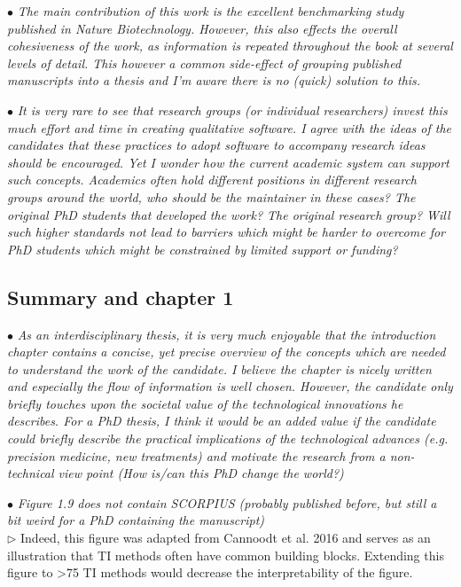 \documentclass[10pt]{article}
\newcommand{\exam}[2][\  ]{\hspace{0pt}\marginpar{\color{red}#1}$\bullet$ \textit{#2}}
\newcommand{\imp}[1]{{\color{red} #1}}
\newcommand{\nimp}[1]{{\color{gray} #1}}
\newcommand{\answ}[1]{{\color{blue} $\triangleright$ #1}}
\newcommand{\bigexclaim}{\raisebox{-0.1em}{\BigTriangleUp}\hspace{-0.32em}\llap{\small\textbf{!}}\hspace{0.32em}}
\newcommand{\tagimp}{\bigexclaim}
\newcommand{\tagtime}{{\Large $\hourglass$}}
\begin{document}
{\exam{\nimp{The main contribution of this work is the excellent benchmarking study
	published in Nature Biotechnology.} However, this also effects the overall
	cohesiveness of the work, as information is repeated throughout the book at
	several levels of detail. \nimp{This however a common side-effect of grouping
	published manuscripts into a thesis and I’m aware there is no (quick) solution
	to this.}}

\exam[\tagimp]{\nimp{It is very rare to see that research groups (or individual researchers) invest this
	much effort and time in creating qualitative software. I agree with the ideas of
	the candidates that these practices to adopt software to accompany research
	ideas should be encouraged.} Yet I wonder how the current academic system
	can support such concepts. Academics often hold different positions in
	different research groups around the world, who should be the maintainer in
	these cases? The original PhD students that developed the work? The original
	research group? Will such higher standards not lead to barriers which might
	be harder to overcome for PhD students which might be constrained by limited
	support or funding?}


\subsection{Summary and chapter 1}

\exam[\tagimp \tagtime]{\nimp{As an interdisciplinary thesis, it is very much enjoyable that the introduction
	chapter contains a concise, yet precise overview of the concepts which are
	needed to understand the work of the candidate. I believe the chapter is nicely
	written and especially the flow of information is well chosen. However, the
	candidate only briefly touches upon the societal value of the technological
	innovations he describes. For a PhD thesis, } \imp{I think it would be an added value
	if the candidate could briefly describe the practical implications of the
	technological advances (e.g. precision medicine, new treatments) and
	motivate the research from a non-technical view point (How is/can this PhD
	change the world?)}}



\exam{Figure 1.9 does not contain SCORPIUS (probably published before,
	but still a bit weird for a PhD containing the manuscript)} \\
\answ{Indeed, this figure was adapted from Cannoodt et al. 2016 and serves as an illustration that
TI methods often have common building blocks. Extending this figure to >75 TI methods would decrease the interpretability of the figure.}

}
\end{document}
